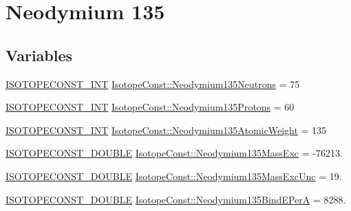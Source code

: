 \hypertarget{group___isotope_const-_neodymium-_nd135}{}\section{Neodymium 135}
\label{group___isotope_const-_neodymium-_nd135}
\subsection*{Variables}
\begin{DoxyCompactItemize}
\item 
\mbox{\hyperlink{group___isotope_const-_macros_ga5f18360b3e99483a35c32d789e62621c}{I\+S\+O\+T\+O\+P\+E\+C\+O\+N\+S\+T\+\_\+\+I\+NT}} \mbox{\hyperlink{group___isotope_const-_neodymium-_nd135_gae0a1a0e56bddeeaa3e1382dcb39e3be4}{Isotope\+Const\+::\+Neodymium135\+Neutrons}} = 75
\item 
\mbox{\hyperlink{group___isotope_const-_macros_ga5f18360b3e99483a35c32d789e62621c}{I\+S\+O\+T\+O\+P\+E\+C\+O\+N\+S\+T\+\_\+\+I\+NT}} \mbox{\hyperlink{group___isotope_const-_neodymium-_nd135_ga3185a53690541f24d74b276cc5fc4f69}{Isotope\+Const\+::\+Neodymium135\+Protons}} = 60
\item 
\mbox{\hyperlink{group___isotope_const-_macros_ga5f18360b3e99483a35c32d789e62621c}{I\+S\+O\+T\+O\+P\+E\+C\+O\+N\+S\+T\+\_\+\+I\+NT}} \mbox{\hyperlink{group___isotope_const-_neodymium-_nd135_ga070e848fa5adbd1f2c95a80e5320ab3d}{Isotope\+Const\+::\+Neodymium135\+Atomic\+Weight}} = 135
\item 
\mbox{\hyperlink{group___isotope_const-_macros_ga8f45a7272ce02c0b4c65c44636ed719a}{I\+S\+O\+T\+O\+P\+E\+C\+O\+N\+S\+T\+\_\+\+D\+O\+U\+B\+LE}} \mbox{\hyperlink{group___isotope_const-_neodymium-_nd135_gab57612b5b94f514c580dae2fa6f1209b}{Isotope\+Const\+::\+Neodymium135\+Mass\+Exc}} = -\/76213.
\item 
\mbox{\hyperlink{group___isotope_const-_macros_ga8f45a7272ce02c0b4c65c44636ed719a}{I\+S\+O\+T\+O\+P\+E\+C\+O\+N\+S\+T\+\_\+\+D\+O\+U\+B\+LE}} \mbox{\hyperlink{group___isotope_const-_neodymium-_nd135_ga04783888f1914cb6372079a59f0deef4}{Isotope\+Const\+::\+Neodymium135\+Mass\+Exc\+Unc}} = 19.
\item 
\mbox{\hyperlink{group___isotope_const-_macros_ga8f45a7272ce02c0b4c65c44636ed719a}{I\+S\+O\+T\+O\+P\+E\+C\+O\+N\+S\+T\+\_\+\+D\+O\+U\+B\+LE}} \mbox{\hyperlink{group___isotope_const-_neodymium-_nd135_ga1bcc259afee1f998e7635fba8abe853b}{Isotope\+Const\+::\+Neodymium135\+Bind\+E\+PerA}} = 8288.
\item 

\end{DoxyCompactItemize}
